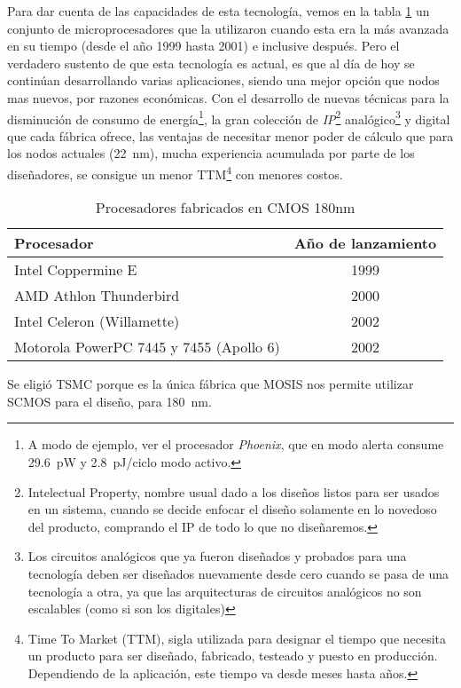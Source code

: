 Para dar cuenta de las capacidades de esta tecnología, vemos en la tabla \ref{cuadro:procesadores180nm} un conjunto de microprocesadores que la utilizaron cuando esta era la más avanzada en su tiempo (desde el año 1999 hasta 2001) e inclusive después. Pero el verdadero sustento de que esta tecnología es actual, es que al día de hoy se continúan desarrollando varias aplicaciones, siendo una mejor opción que nodos mas nuevos, por razones económicas. Con el desarrollo de nuevas técnicas para la disminución de consumo de energía\footnote{A modo de ejemplo, ver el procesador \emph{Phoenix}, que en modo alerta consume 29.6~pW y 2.8~pJ/ciclo modo activo\cite{phoenixP}.}, la gran colección de \emph{IP}\footnote{Intelectual Property, nombre usual dado a los diseños listos para ser usados en un sistema, cuando se decide enfocar el diseño solamente en lo novedoso del producto, comprando el IP de todo lo que no diseñaremos.} analógico\footnote{Los circuitos analógicos que ya fueron diseñados y probados para una tecnología deben ser diseñados nuevamente desde cero cuando se pasa de una tecnología a otra, ya que las arquitecturas de circuitos analógicos no son escalables (como si son los digitales)} y digital que cada fábrica ofrece, las ventajas de necesitar menor poder de cálculo que para los nodos actuales (22~nm), mucha experiencia acumulada por parte de los diseñadores, se consigue un menor TTM\footnote{Time To Market (TTM), sigla utilizada para designar el tiempo que necesita un producto para ser diseñado, fabricado, testeado y puesto en producción. Dependiendo de la aplicación, este tiempo va desde meses hasta años.} con menores costos.


\begin{table}[h]
\centering
\begin{tabular}{@{}lc@{}}
\toprule
Procesador             & Año de lanzamiento \\ \midrule
Intel Coppermine E                & 1999             \\
AMD Athlon Thunderbird      & 2000             \\
Intel Celeron (Willamette)               & 2002            \\
Motorola PowerPC 7445 y 7455 (Apollo 6) & 2002           \\ \bottomrule
\end{tabular}
\caption{Procesadores fabricados en CMOS 180nm }
\label{cuadro:procesadores180nm}
\end{table}

Se eligió TSMC porque es la única fábrica que MOSIS nos permite utilizar SCMOS para el diseño, para 180~nm.

